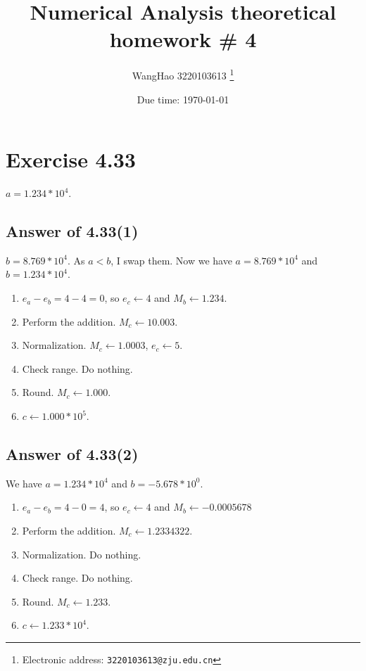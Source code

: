 \documentclass[a4paper]{article}
\begin{document}
\title{Numerical Analysis theoretical homework \# 4}

\author{WangHao 3220103613
  \thanks{Electronic address: \texttt{3220103613@zju.edu.cn}}}


\date{Due time: \today}

\maketitle
\section*{Exercise 4.33}
$a=1.234*10^4$.
\subsection*{Answer of 4.33(1)}
$b=8.769*10^4$. 
As $a<b$, I swap them. Now we have $a=8.769*10^4$ and $b=1.234*10^4$.

\begin{enumerate}[label=(\roman*)] 
    \item $e_a-e_b=4-4=0$, so $e_c \gets 4$ and $M_b \gets 1.234$.
    \item Perform the addition. $M_c \gets 10.003$.
    \item Normalization. $M_c \gets 1.0003$, $e_c \gets 5$.
    \item Check range. Do nothing.
    \item Round. $M_c \gets 1.000$.
    \item $c \gets 1.000 * 10^5$.
\end{enumerate}

\subsection*{Answer of 4.33(2)}
We have $a=1.234*10^4$ and $b=-5.678*10^0$.

\begin{enumerate}[label=(\roman*)] 
    \item $e_a-e_b=4-0=4$, so $e_c \gets 4$ and $M_b \gets -0.0005678$
    \item Perform the addition. $M_c \gets 1.2334322$.
    \item Normalization. Do nothing.
    \item Check range. Do nothing.
    \item Round. $M_c \gets 1.233$.
    \item $c \gets 1.233 * 10^4$.
\end{enumerate}
\end{document}
